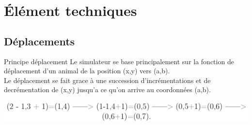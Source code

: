 \documentclass{beamer}
\begin{document}
\section{Élément techniques}

\subsection{Déplacements}
\begin{frame}{Principe déplacement }
    \hspace{0.2cm} Le simulateur se base principalement sur la fonction de déplacement d'un animal de la position (x,y) vers (a,b).\\
    \vspace{0.3cm}
    \hspace{0.2cm}Le déplacement se fait grace à une succession d'incrémentations et de decrémentation de (x,y) jusqu'a ce qu'on arrive au coordonnées (a,b).
    \begin{center}
            \includegraphics[keepaspectratio, scale=0.22]{images/dep.png}
        \end{center}
\end{frame}
\end{document}
